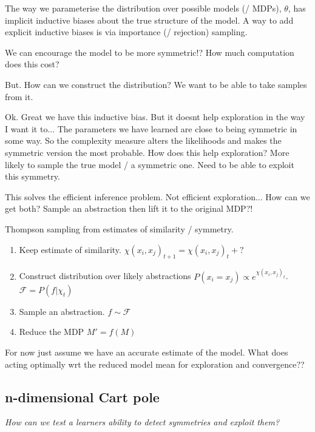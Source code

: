 The way we parameterise the distribution over possible models (/ MDPs), $\theta$, has implicit inductive biases about the true structure of the model.
A way to add explicit inductive biases is via importance (/ rejection) sampling.

We can encourage the model to be more symmetric!?
How much computation does this cost?

But. How can we construct the distribution? We want to be able to take samples
from it.

Ok. Great we have this inductive bias. But it doesnt help exploration in the way I want it to...
The parameters we have learned are close to being symmetric in some way. So the complexity measure alters the likelihoods and makes the symmetric version the most probable.
How does this help exploration? More likely to sample the true model / a symmetric one. Need to be able to exploit this symmetry.

This solves the efficient inference problem. Not efficient exploration... How can we get both?
Sample an abstraction then lift it to the original MDP?!


Thompson sampling from estimates of similarity / symmetry.
\begin{enumerate}
	\tightlist
	\item Keep estimate of similarity. $\chi(x_i, x_j)_{t+1} = \chi(x_i, x_j)_t + ?$
	\item Construct distribution over likely abstractions $P(x_i = x_j) \propto e^{\chi(x_i, x_j)_t}$. $\mathcal F = P(f|\chi_t)$
	\item Sample an abstraction. $f\sim \mathcal F$
	\item Reduce the MDP $M' = f(M)$
\end{enumerate}


For now just assume we have an accurate estimate of the model.
What does acting optimally wrt the reduced model mean for exploration and convergence??



\subsection{n-dimensional Cart pole}\label{action-space-experiments}

\begin{displayquote}
  \textit{How can we test a learners ability to detect symmetries and exploit them?}
\end{displayquote}

